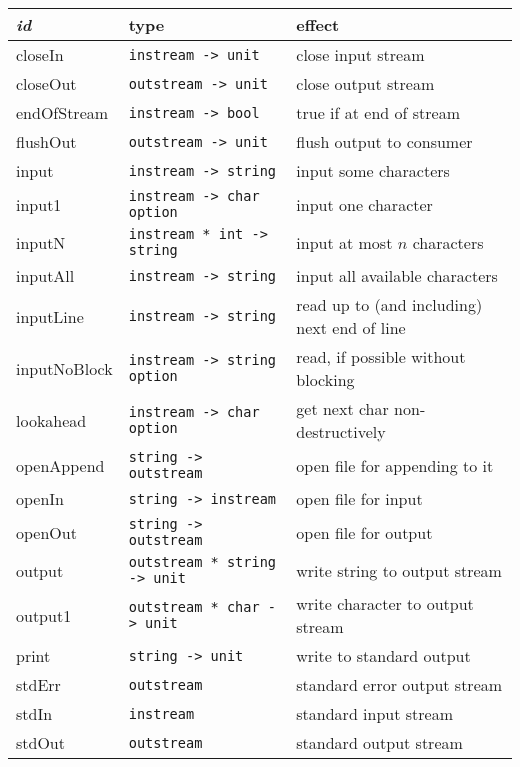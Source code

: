 \documentclass[fleqn,a4paper]{article}
\begin{document}
\begin{tabular}{@{\tt\ \ }lll}\hline
{\it id\/}  &  type &     effect \\\hline

closeIn       & {\tt instream -> unit}  
        & close input stream\\
closeOut      & {\tt outstream -> unit}
        & close output stream\\
endOfStream  & {\tt instream -> bool}
        & true if at end of stream\\
flushOut     & {\tt outstream -> unit}
        & flush output to consumer\\
input         & {\tt instream -> string}
        & input some characters\\
input1         & {\tt instream -> char option}
        & input one character\\
inputN         & {\tt instream * int -> string}
        & input at most $n$ characters\\
inputAll         & {\tt instream -> string} 
        & input all available characters\\
inputLine    & {\tt instream -> string}
        & read up to (and including) next end of line\\
inputNoBlock    & {\tt instream -> string option}
        & read, if possible without blocking\\
lookahead      & {\tt instream -> char option} 
        & get next char non-destructively\\
openAppend   & {\tt string -> outstream} 
        & open file for appending to it\\
openIn       & {\tt string -> instream}
        & open file for input\\
openOut      & {\tt string -> outstream} 
        & open file for output\\
output         & {\tt outstream * string -> unit}   
        & write string to output stream\\
output1        & {\tt outstream * char -> unit}
        & write character to output stream\\
print   & {\tt string -> unit} 
        & write to standard output\\ 
stdErr       & {\tt outstream} 
        & standard error output stream\\
stdIn        & {\tt instream} 
        & standard input stream\\
stdOut       & {\tt outstream} 
        & standard output stream\\
\hline
\end{tabular}
\end{document}
